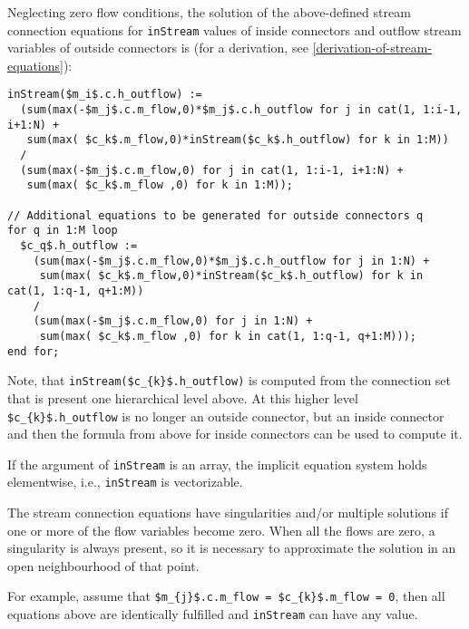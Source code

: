 Neglecting zero flow conditions, the solution of the above-defined
stream connection equations for \lstinline!inStream! values of inside connectors and
outflow stream variables of outside connectors is (for a derivation, see
\autoref{derivation-of-stream-equations}):
\begin{lstlisting}[language=modelica,mathescape=true]
inStream($m_i$.c.h_outflow) :=
  (sum(max(-$m_j$.c.m_flow,0)*$m_j$.c.h_outflow for j in cat(1, 1:i-1, i+1:N) +
   sum(max( $c_k$.m_flow,0)*inStream($c_k$.h_outflow) for k in 1:M))
  /
  (sum(max(-$m_j$.c.m_flow,0) for j in cat(1, 1:i-1, i+1:N) +
   sum(max( $c_k$.m_flow ,0) for k in 1:M));

// Additional equations to be generated for outside connectors q
for q in 1:M loop
  $c_q$.h_outflow :=
    (sum(max(-$m_j$.c.m_flow,0)*$m_j$.c.h_outflow for j in 1:N) +
     sum(max( $c_k$.m_flow,0)*inStream($c_k$.h_outflow) for k in cat(1, 1:q-1, q+1:M))
    /
    (sum(max(-$m_j$.c.m_flow,0) for j in 1:N) +
     sum(max( $c_k$.m_flow ,0) for k in cat(1, 1:q-1, q+1:M)));
end for;
\end{lstlisting}

\begin{nonnormative}
Note, that \lstinline[mathescape=true]!inStream($c_{k}$.h_outflow)! is computed from the connection set that is present one hierarchical level above.  At this higher level
\lstinline[mathescape=true]!$c_{k}$.h_outflow! is no longer an outside connector, but an inside connector and then the formula from above for inside connectors can be used
to compute it.
\end{nonnormative}

If the argument of \lstinline!inStream! is an array, the implicit
equation system holds elementwise, i.e., \lstinline!inStream! is
vectorizable.

The stream connection equations have singularities and/or multiple
solutions if one or more of the flow variables become zero. When all the
flows are zero, a singularity is always present, so it is necessary to
approximate the solution in an open neighbourhood of that point.

\begin{nonnormative}
For example, assume that \lstinline[mathescape=true]!$m_{j}$.c.m_flow = $c_{k}$.m_flow = 0!, then all equations above are identically fulfilled and \lstinline!inStream! can have any value.
\end{nonnormative}

